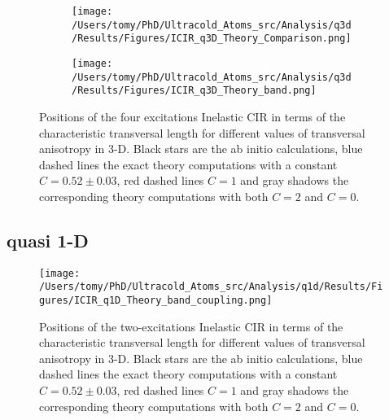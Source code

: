 \documentclass[aps,pre,twocolumn,superscriptaddress,showpacs]{revtex4-1}
\begin{document}
	\begin{figure}[htbp!]
	 \begin{subfigure}{0.5\textwidth}
	  \centering
	 \texttt{[image: /Users/tomy/PhD/Ultracold\_Atoms\_src/Analysis/q3d/Results/Figures/ICIR\_q3D\_Theory\_Comparison.png]}
	 \end{subfigure}
	 \vspace{10pt}
	 \begin{subfigure}{0.5\textwidth}
	   \centering
    	 \texttt{[image: /Users/tomy/PhD/Ultracold\_Atoms\_src/Analysis/q3d/Results/Figures/ICIR\_q3D\_Theory\_band.png]}
	 \end{subfigure}
    	\caption{Positions of the four excitations Inelastic CIR in terms of the characteristic transversal length for different values of transversal anisotropy in 3-D. Black stars are the ab initio calculations, blue dashed lines the exact theory computations with a constant $C=0.52\pm0.03$, red dashed lines $C=1$ and gray shadows the corresponding theory computations with both $C=2$ and $C=0$. }
    	\label{fig:q3d ICIR}
	\end{figure}
	
\newpage
\subsection{quasi 1-D} \label{subsec:quasi 1-D}
\begin{figure}[htbp!]
   	 \centering
    	\texttt{[image: /Users/tomy/PhD/Ultracold\_Atoms\_src/Analysis/q1d/Results/Figures/ICIR\_q1D\_Theory\_band\_coupling.png]}
    	\caption{Positions of the two-excitations Inelastic CIR in terms of the characteristic transversal length for different values of transversal anisotropy in 3-D. Black stars are the ab initio calculations, blue dashed lines the exact theory computations with a constant $C=0.52\pm0.03$, red dashed lines $C=1$ and gray shadows the corresponding theory computations with both $C=2$ and $C=0$.}
    	\label{fig:q1D ICIR}
	\end{figure}
\newpage
\end{document}
